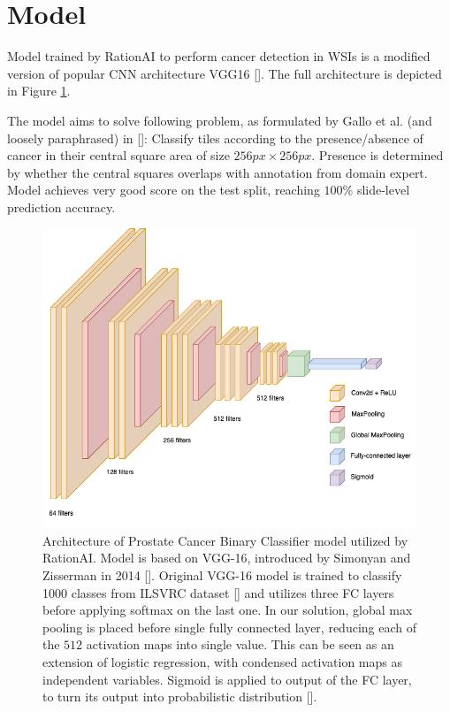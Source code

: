 \section{Model}

Model trained by RationAI to perform cancer detection in WSIs is a modified version of popular CNN architecture VGG16 []. The full architecture is depicted in Figure \ref{fig:rationai-vgg16}.

The model aims to solve following problem, as formulated by Gallo et al. (and loosely paraphrased) in []: Classify tiles according to the presence/absence of cancer in their central square area of size $256 px \times 256 px$. Presence is determined by whether the central squares overlaps with annotation from domain expert. Model achieves very good score on the test split, reaching $100$\% slide-level prediction accuracy.


\begin{figure}[!h]
    \begin{center}
    \begin{minipage}{0.75\textwidth}
      \includegraphics[width=\textwidth]{img/nn-arch.png}
    \end{minipage}
    \caption{Architecture of Prostate Cancer Binary Classifier model utilized by RationAI. Model is based on VGG-16, introduced by Simonyan and Zisserman in 2014 []. Original VGG-16 model is trained to classify 1000 classes from ILSVRC dataset [] and utilizes three FC layers before applying softmax on the last one. In our solution, global max pooling is placed before single fully connected layer, reducing each of the $512$ activation maps into single value. This can be seen as an extension of logistic regression, with condensed activation maps as independent variables. Sigmoid is applied to output of the FC layer, to turn its output into probabilistic distribution [].}
    \label{fig:rationai-vgg16}
    \end{center}

\end{figure}

